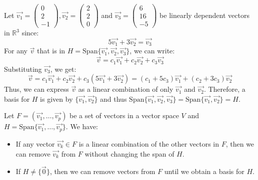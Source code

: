 \begin{eg}
    Let $\vec{v_1} = \begin{pmatrix}
        0 \\ 2 \\ -1
    \end{pmatrix}, \vec{v_2} = \begin{pmatrix}
        2 \\ 2 \\ 0
    \end{pmatrix}$ and $\vec{v_3} = \begin{pmatrix}
        6 \\ 16 \\ -5
    \end{pmatrix}$ be linearly dependent vectors in $\mathbb{R}^3$ since:
    \[ 5\vec{v_1} + 3\vec{v_2} = \vec{v_3} \]
    For any $\vec{v}$ that is in $H = \text{Span}\{\vec{v_1}, \vec{v_2}, \vec{v_3}\}$, we can write:
    \[ \vec{v} = c_1 \vec{v_1} + c_2 \vec{v_2} + c_3 \vec{v_3} \]
    Substituting $\vec{v_3}$, we get:
    \[ \vec{v} = c_1 \vec{v_1} + c_2 \vec{v_2} + c_3 (5\vec{v_1} + 3\vec{v_2}) = (c_1 + 5c_3)\vec{v_1} + (c_2 + 3c_3)\vec{v_2} \]
    Thus, we can express $\vec{v}$ as a linear combination of only $\vec{v_1}$ and $\vec{v_2}$. Therefore, a basis for $H$ is given by $\{\vec{v_1}, \vec{v_2}\}$ and thus $\text{Span}\{\vec{v_1}, \vec{v_2}, \vec{v_3}\} = \text{Span}\{\vec{v_1}, \vec{v_2}\} = H$.
\end{eg}

\begin{theorem}
    Let $F = (\vec{v_1}, \ldots, \vec{v_p})$ be a set of vectors in a vector space $V$ and $H = \text{Span}\{\vec{v_1}, \ldots, \vec{v_p}\}$. We have:
    \begin{itemize}[itemsep=1pt,label=$\circ$]
        \item If any vector $\vec{v_k} \in F$ is a linear combination of the other vectors in $F$, then we can remove $\vec{v_k}$ from $F$ without changing the span of $H$.
        \item If $H \neq \{\vec{0}\}$, then we can remove vectors from $F$ until we obtain a basis for $H$.
    \end{itemize}
\end{theorem}

